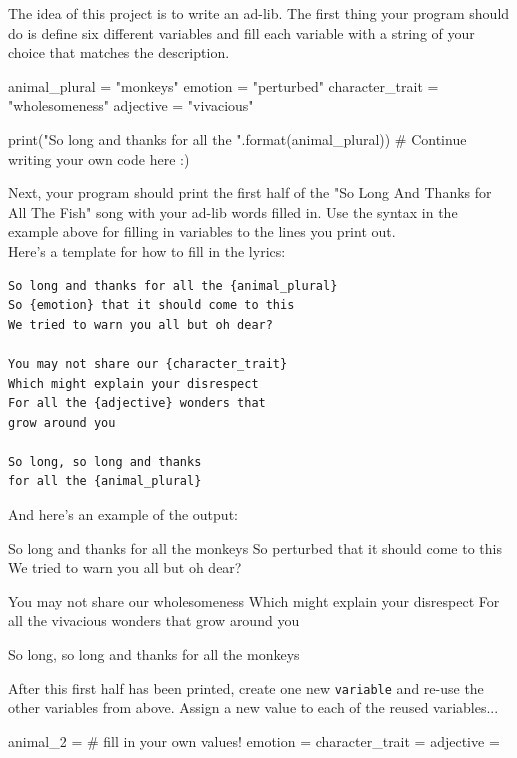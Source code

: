 \documentclass{42-en}
\begin{document}
The idea of this project is to write an ad-lib. The first thing your program should do is define six different variables and fill each variable with a string of your choice that matches the description.

\begin{42pycode}
animal_plural = "monkeys"
emotion = "perturbed"
character_trait = "wholesomeness"
adjective = "vivacious"

print("So long and thanks for all the {}".format(animal_plural))
# Continue writing your own code here :)
\end{42pycode}

Next, your program should print the first half of the "So Long And Thanks for All The Fish" song with your ad-lib words filled in. Use the syntax in the example above for filling in variables to the lines you print out.\\

Here's a template for how to fill in the lyrics:

\begin{verbatim}
So long and thanks for all the {animal_plural}
So {emotion} that it should come to this
We tried to warn you all but oh dear?

You may not share our {character_trait}
Which might explain your disrespect
For all the {adjective} wonders that
grow around you

So long, so long and thanks
for all the {animal_plural}
\end{verbatim}


And here's an example of the output:

\begin{42console}
So long and thanks for all the monkeys
So perturbed that it should come to this
We tried to warn you all but oh dear?

You may not share our wholesomeness
Which might explain your disrespect
For all the vivacious wonders that
grow around you

So long, so long and thanks
for all the monkeys
\end{42console}


After this first half has been printed, create one new \texttt{variable} and re-use the other variables from above. Assign a new value to each of the reused variables...\\
\begin{42pycode}
animal_2 = # fill in your own values!
emotion =
character_trait =
adjective =
\end{42pycode}
\end{document}
